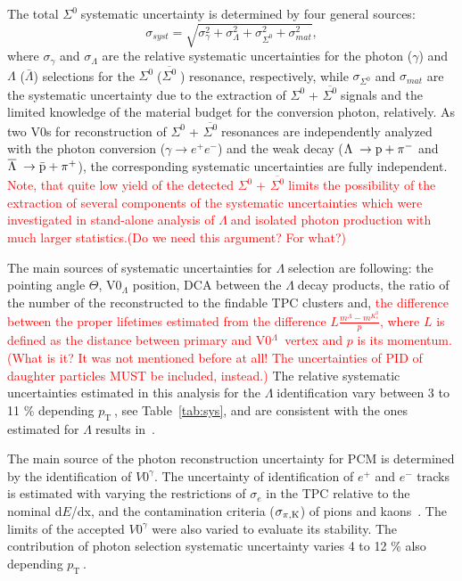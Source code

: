 \documentclass[ALICE,manyauthors]{cernphprep}
\newcommand{\sig}{\ensuremath{\Sigma^0  \; }}
\newcommand{\asig}{\ensuremath{\overline{\Sigma^0} \; }}
\newcommand{\lam}{\ensuremath{\Lambda \; }}
\newcommand{\alam}{\ensuremath{\overline{\Lambda} \; }}
\newcommand{\pt}{\ensuremath{p_{\mathrm{T}\; }}}
\newcommand{\red}{\textcolor{red}}
\begin{document}
The total \sig systematic uncertainty is determined by four general sources: 
\begin{equation}
 \sigma_{syst} = \sqrt{ \sigma_{\gamma}^2 + \sigma_{\Lambda}^2 + \sigma_{\Sigma^0}^2  + \sigma_{mat}^2 },
 \label{eq:systematic}
\end{equation}
where $\sigma_{\gamma}$ and $\sigma_{\Lambda}$ are the relative systematic uncertainties for the photon ($\gamma$) 
and $\Lambda$ ($\bar{\Lambda}$) selections for the \sig (\asig) resonance, respectively, while $\sigma_{\Sigma^0}$ 
and  $\sigma_{mat}$ are the systematic uncertainty due to the extraction of \sig + \asig signals and the limited 
knowledge of the material budget for the conversion photon, relatively. As two V0s for reconstruction of 
\sig + \asig resonances are independently analyzed with the photon conversion ($\gamma \to e^+ e^-$) and 
the weak decay ($\lam \to  \rm{p} + \pi^-$ and $\alam \to \rm{\bar{p}} + \pi^+$), the corresponding systematic 
uncertainties are fully independent. \red{Note, that quite low yield of the detected \sig + \asig limits the possibility 
of the extraction of several components of the systematic uncertainties which were investigated in
stand-alone analysis of \lam and isolated photon production with much larger statistics.(Do we need this argument? For what?)}

The main sources of systematic uncertainties for \lam selection are following:
the pointing angle $\Theta$, V0$_{\Lambda}$ position, DCA between the \lam decay products, the ratio of 
 the number of the reconstructed to the findable TPC clusters and, \red{the difference between 
 the proper lifetimes estimated from the difference $L \frac{m^{\Lambda} - m^{K^0_s}}{p}$,
where $L$ is defined as the distance between primary and  V0$^{\lam}$ vertex and
$p$ is its momentum.(What is it? It was not mentioned before at all! The uncertainties of 
PID of daughter particles MUST be included, instead.)}
The relative systematic uncertainties estimated in this analysis for the \lam identification 
vary between 3 to 11 \% depending \pt, see Table~\ref{tab:sys}, and are consistent
with the ones estimated for \lam results in~\cite{cite:DDChin-Lam,cite:lambda_pp}.

The main source of the photon reconstruction uncertainty for PCM is determined by the identification
of $V0^{\gamma}$. The uncertainty of identification of $e^+$ and $e^-$ tracks is estimated with varying 
the restrictions of $\sigma_e$ in the TPC relative to the nominal d$E$/dx, and the contamination criteria
($\sigma_{\pi,\rm{K}}$) of pions and kaons~\cite{cite:pi0-2012}. The limits of the accepted
$V0^{\gamma}$ were also varied to evaluate its stability. The contribution of photon selection 
systematic uncertainty varies 4 to 12 \% also depending \pt. 
\end{document}
